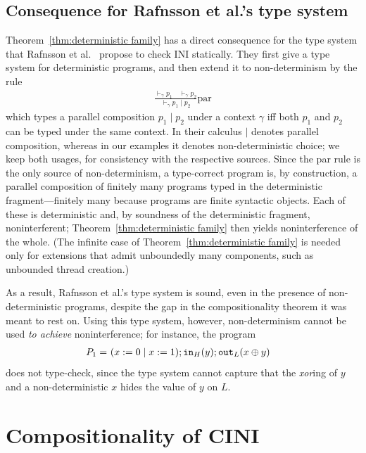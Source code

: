 \documentclass[preprint,5p,twocolumn]{elsarticle}
\begin{document}
\subsection{Consequence for Rafnsson et al.'s type system}

Theorem~\ref{thm:deterministic family} has a direct consequence for the type system that
Rafnsson et al.~\cite{Rafnsson2012} propose to check INI statically. They first give a type system
for deterministic programs, and then extend it to non-determinism by the rule
\begin{align*}
    \frac{\vdash_\gamma p_1 \quad \vdash_\gamma p_2}{\vdash_\gamma p_1 \mid p_2}\textrm{par}
\end{align*}
which types a parallel composition $p_1 \mid p_2$ under a context $\gamma$ iff both $p_1$ and
$p_2$ can be typed under the same context. In their calculus $\mid$ denotes parallel composition,
whereas in our examples it denotes non-deterministic choice; we keep both usages, for consistency
with the respective sources. Since the \textrm{par} rule is the only source of
non-determinism, a type-correct program is, by construction, a parallel composition of finitely
many programs typed in the deterministic fragment---finitely many because programs are finite
syntactic objects. Each of these is deterministic and, by soundness of the deterministic fragment,
noninterferent; Theorem~\ref{thm:deterministic family} then yields noninterference of the whole.
(The infinite case of Theorem~\ref{thm:deterministic family} is needed only for extensions that
admit unboundedly many components, such as unbounded thread creation.)

As a result, Rafnsson et al.'s type system is sound, even in the presence of non-deterministic
programs, despite the gap in the compositionality theorem it was meant to rest on. Using this type
system, however, non-determinism cannot be used \emph{to achieve} noninterference; for instance,
the program
\begin{align*}
  P_1=~&(x := 0 \mid x := 1); \mathtt{in}_{H}(y); \mathtt{out}_{L}(x \oplus y)
\end{align*}
does not type-check, since the type system cannot capture that the \emph{xor}ing of $y$ and a
non-deterministic $x$ hides the value of $y$ on $L$.

\section{Compositionality of CINI}
\end{document}
